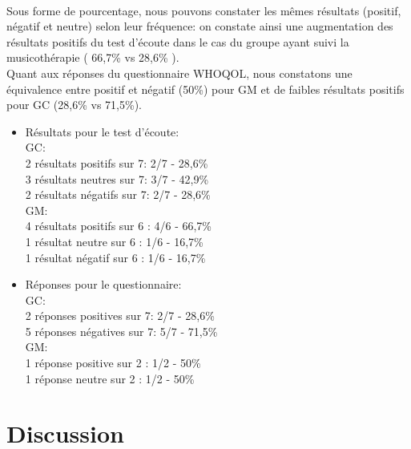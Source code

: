  \\
  Sous forme de pourcentage, nous pouvons constater les mêmes résultats (positif, négatif et neutre) 
 selon leur fréquence: on constate ainsi une augmentation des résultats positifs du test d'écoute dans le 
 cas du groupe ayant suivi la musicothérapie ( 66,7\% vs 28,6\% ). 
 	 \\ 
 Quant aux réponses du questionnaire WHOQOL, nous constatons une équivalence entre positif et 
 négatif (50\%) pour GM et de faibles résultats positifs pour GC (28,6\% vs 71,5\%).
    
   \begin{itemize}
   	 \item Résultats pour le test d'écoute:
   	 \\ 
 GC: 
  \\
2 résultats positifs sur 7:       2/7 - 28,6\%
\\
3 résultats neutres sur 7:			3/7 - 42,9\%
 \\
 2 résultats négatifs sur 7:		2/7 - 28,6\%
 \\
GM:
  \\
 4 résultats positifs sur 6    :       4/6 - 66,7\%
  \\
  1 résultat neutre sur 6 : 			1/6 - 16,7\%
 \\  
  1 résultat négatif sur 6 : 		     1/6 - 16,7\%
 \\
  		    \item Réponses pour le questionnaire:    
 \\
 GC: 
 \\
 2 réponses positives sur 7:       2/7  - 28,6\%
 \\
 5 réponses négatives sur 7: 	5/7 - 71,5\%
 \\
 GM:
  \\
 1 réponse positive sur 2    :       1/2 - 50\%
   \\
   1 réponse neutre sur 2 : 			1/2 - 50\%
  		  \end{itemize}
  	 
  
\chapter{Discussion}
\label{Conclusions}

